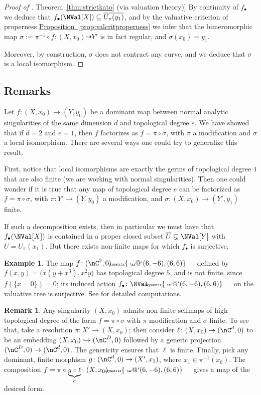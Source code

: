 \documentclass[11 pt, twoside, a4paper]{amsart}
\makeatletter
\newcommand{\Kpi}{{\pi}} %
\newcommand{\Ksigma}{{\sigma}} %
\newcommand{\selfarrow}[1][]{\tiny{\!\!\!\xymatrix{\phantom{|}\ar@`{(6,-6),(6,6)}}\hspace{4mm}}}
\theoremstyle{definition}
\newtheorem{rem}[thm]{Remark}
\newtheorem{ex}[thm]{Example}
\theoremstyle{definition}
\newcommand{\refprop}[1]{\hyperref[prop:#1]{Proposition~\ref*{prop:#1}}}
\newcommand{\refthm}[1]{\hyperref[thm:#1]{Theorem~\ref*{thm:#1}}}
\makeatother
\begin{document}
\begin{proof}[Proof of \refthm{strictkato} (via valuation theory)]
By continuity of $f_\bullet$ we deduce that $f_\bullet(\NVal[X]) \subseteq \overline{U_\pi(y_1)}$, and by the valuative criterion of properness \refprop{valcritproperness} we infer that the bimeromorphic map $\sigma := \pi^{-1} \circ f \colon (X,x_0) \dashrightarrow Y'$ is in fact regular, and $\sigma(x_0)=y_1$.

Moreover, by construction, $\sigma$ does not contract any curve, and we deduce that $\sigma$ is a local isomorphism. 
\end{proof}

\subsection{Remarks}

Let $f \colon (X,x_0) \to (Y,y_0)$ be a dominant map between normal analytic singularities of the same dimension $d$ and topological degree $e$.
We have showed that if $d=2$ and $e=1$, then $f$ factorizes as $f=\Kpi \circ \Ksigma$, with $\Kpi$ a modification and $\Ksigma$ a local isomorphism.
There are several ways one could try to generalize this result.

First, notice that local isomorphisms are exactly the germs of topological degree $1$ that are also finite (we are working with normal singularities).
Then one could wonder if it is true that any map of topological degree $e$ can be factorized as $f=\Kpi \circ \Ksigma$, with $\Kpi \colon Y' \to (Y,y_0)$ a modification, and $\Ksigma \colon (X,x_0) \to (Y',y_1)$ finite.

If such a decomposition exists, then in particular we must have that $f_\bullet (\NVal[X])$ is contained in a proper closed subset $\overline{U} \varsubsetneq \NVal[Y]$ with $U=U_\Kpi(x_1)$.
But there exists non-finite maps for which $f_\bullet$ is surjective.

\begin{ex}
The map $f \colon (\nC^2,0) \selfarrow$ defined by $f(x,y)=\big(x(y+x^3),x^2y\big)$ has topological degree $5$, and is not finite, since $f(\{x=0\})=0$; its induced action $f_\bullet \colon \NVal \selfarrow$ on the valuative tree is surjective. See \cite[Section 9.2]{gignac-ruggiero:locdynnoninvnormsurfsing} for detailed computations.
\end{ex}

\begin{rem}\label{rem:hitopnonfinite}
Any singularity $(X,x_0)$ admits non-finite selfmaps of high topological degree of the form $f = \Kpi \circ \Ksigma$ with $\Kpi$ modification and $\Ksigma$ finite.
To see that, take a resolution $\Kpi \colon X' \to (X,x_0)$; then consider $\ell \colon (X,x_0) \to (\nC^d,0)$ to be an embedding $(X,x_0) \hookrightarrow (\nC^D,0)$ followed by a generic projection $(\nC^D,0) \to (\nC^d,0)$. The genericity ensures that $\ell$ is finite.
Finally, pick any dominant, finite morphism $g \colon (\nC^d,0) \to (X',x_1)$, where $x_1 \in \pi^{-1}(x_0)$.
The composition $f=\Kpi \circ \underbrace{g \circ \ell}_{\Ksigma} \colon (X,x_0) \selfarrow$ gives a map of the desired form.
\end{rem}
\end{document}
